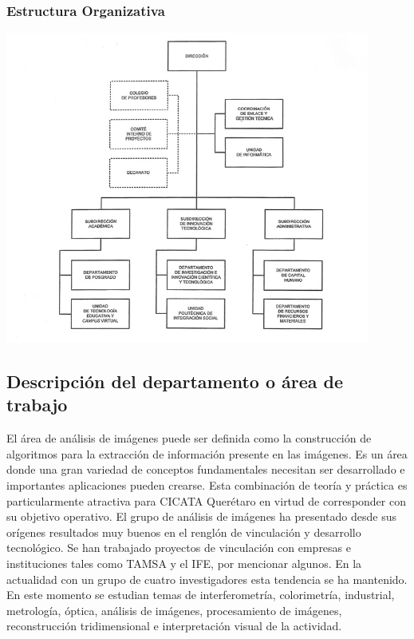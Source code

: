 \documentclass[12pt]{book} %
\begin{document}
 		\subsubsection{Estructura Organizativa}
 			\begin{center}
			 	\includegraphics[width=0.9\textwidth]{./imagenes/organigrama}
			 \end{center}
			 
	
	\subsection{Descripción del departamento o área de trabajo}
		 El área de análisis de imágenes puede ser definida como la construcción de algoritmos para la extracción de 
		 información presente en las imágenes. Es un área donde una gran variedad de conceptos fundamentales necesitan 
		 ser desarrollado e importantes aplicaciones pueden crearse. Esta combinación de teoría y práctica es particularmente 
		 atractiva para CICATA Querétaro en virtud de corresponder con su objetivo operativo. El grupo de análisis de imágenes 
		 ha presentado desde sus orígenes resultados muy buenos en el renglón de vinculación y desarrollo tecnológico.  
		 Se han trabajado proyectos de vinculación con empresas e instituciones tales como TAMSA y el IFE, por mencionar algunos. 
		 En la actualidad con un grupo de cuatro investigadores esta tendencia se ha mantenido.  En este momento se estudian 
		 temas de interferometría, colorimetría, industrial, metrología, óptica, análisis de imágenes, procesamiento de imágenes, 
		 reconstrucción tridimensional e interpretación visual de la actividad.
\end{document}
